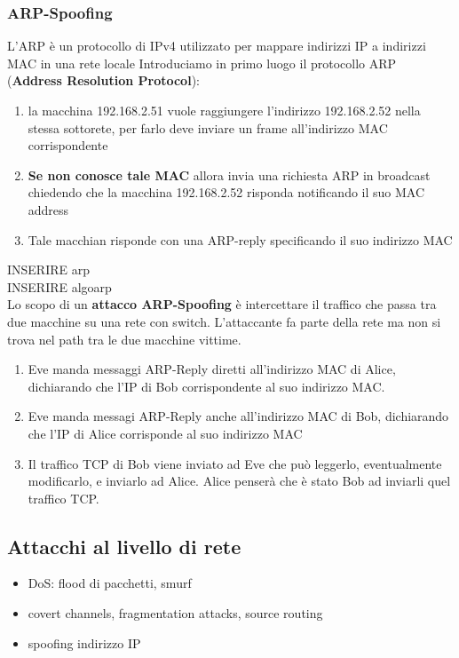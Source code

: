 \documentclass[12pt]{article}
\begin{document}
			\subsubsection{ARP-Spoofing}
				L'ARP è un protocollo di IPv4 utilizzato per mappare indirizzi IP a indirizzi MAC in una rete locale
				Introduciamo in primo luogo il protocollo ARP (\textbf{Address Resolution Protocol}):
				\begin{enumerate}
					\item la macchina 192.168.2.51 vuole raggiungere l'indirizzo 192.168.2.52 nella stessa sottorete, per farlo deve inviare un frame all'indirizzo MAC corrispondente
					\item \textbf{Se non conosce tale MAC} allora invia una richiesta ARP in broadcast chiedendo che la macchina 192.168.2.52 risponda notificando il suo MAC address
					\item Tale macchian risponde con una ARP-reply specificando il suo indirizzo MAC
				\end{enumerate}
				
				INSERIRE arp\\
				
				INSERIRE algoarp\\
				
				Lo scopo di un \textbf{attacco ARP-Spoofing} è intercettare il traffico che passa tra due macchine su una rete con switch. L'attaccante fa parte della rete ma non si trova nel path tra le due macchine vittime.	
				\begin{enumerate}
					\item Eve manda messaggi ARP-Reply diretti all'indirizzo MAC di Alice, dichiarando che l'IP di Bob corrispondente al suo indirizzo MAC.
					\item Eve manda messagi ARP-Reply anche all'indirizzo MAC di Bob, dichiarando che l'IP di Alice corrisponde al suo indirizzo MAC
					\item Il traffico TCP di Bob viene inviato ad Eve che può leggerlo, eventualmente modificarlo, e inviarlo ad Alice. Alice penserà che è stato Bob ad inviarli quel traffico TCP. 
				\end{enumerate}
		\subsection{Attacchi al livello di rete}
			\begin{itemize}
				\item DoS: flood di pacchetti, smurf
				\item covert channels, fragmentation attacks, source routing
				\item spoofing indirizzo IP
			\end{itemize}
\end{document}
